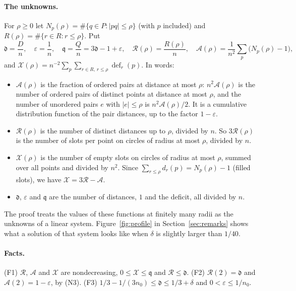 \documentclass[11pt]{article}
\newcommand{\eps}{\varepsilon}
\newcommand{\cA}{\mathcal{A}}
\newcommand{\cR}{\mathcal{R}}
\newcommand{\cX}{\mathcal{X}}
\newcommand{\dd}{\mathfrak{d}}
\newcommand{\qq}{\mathfrak{q}}
\theoremstyle{remark}
\begin{document}
\paragraph{The unknowns.} For $\rho \ge 0$ let
$N_p(\rho) = \#\{q \in P : |pq| \le \rho\}$ (with $p$ included) and
$R(\rho) = \#\{r \in R : r \le \rho\}$. Put
\[
  \dd = \frac Dn, \quad \eps = \frac1n, \quad \qq = \frac Qn = 3\dd - 1 + \eps,
  \quad \cR(\rho) = \frac{R(\rho)}n, \quad
  \cA(\rho) = \frac1{n^2}\sum_p \bigl(N_p(\rho) - 1\bigr),
\]
and $\cX(\rho) = n^{-2}\sum_p\sum_{r\in R,\, r\le\rho}\operatorname{def}_r(p)$.
In words:
\begin{itemize}
\item $\cA(\rho)$ is the fraction of ordered pairs at distance at most
  $\rho$: $n^2\cA(\rho)$ is the number of ordered pairs of distinct points
  at distance at most $\rho$, and the number of unordered pairs $e$ with
  $|e| \le \rho$ is $n^2\cA(\rho)/2$. It is a cumulative distribution
  function of the pair distances, up to the factor $1 - \eps$.
\item $\cR(\rho)$ is the number of distinct distances up to $\rho$,
  divided by $n$. So $3\cR(\rho)$ is the number of slots per point on
  circles of radius at most $\rho$, divided by $n$.
\item $\cX(\rho)$ is the number of empty slots on circles of radius at most $\rho$, summed over all points and divided by $n^2$. Since
  $\sum_{r\le\rho} d_r(p) = N_p(\rho) - 1$ (filled slots), we have
  $\cX = 3\cR - \cA$.
\item $\dd$, $\eps$ and $\qq$ are the number of distances, $1$ and the
  deficit, all divided by $n$.
\end{itemize}
The proof treats the values of these functions at finitely many radii as
the unknowns of a linear system. Figure~\ref{fig:profile} in
Section~\ref{sec:remarks} shows what a solution of that system looks like
when $\delta$ is slightly larger than $1/40$.

\paragraph{Facts.} (F1) $\cR$, $\cA$ and $\cX$ are nondecreasing,
$0 \le \cX \le \qq$ and $\cR \le \dd$. (F2) $\cR(2) = \dd$ and
$\cA(2) = 1 - \eps$, by (N3). (F3) $1/3 - 1/(3n_0) \le \dd \le 1/3 + \delta$
and $0 < \eps \le 1/n_0$.
\end{document}
